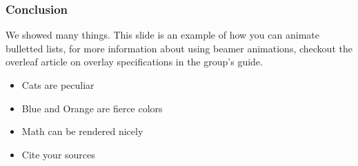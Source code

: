 \begin{frame}
  \frametitle{Conclusion}
        We showed many things. This slide is an example of how 
        you can animate bulletted lists, for more information about
        using beamer animations, checkout the overleaf article on 
        overlay specifications in the group's guide.
        \begin{itemize}
                \item Cats are peculiar
                \pause
                \item Blue and Orange are fierce colors
                \pause
                \item Math can be rendered nicely
                \pause
                \item Cite your sources
        \end{itemize}
\end{frame}
